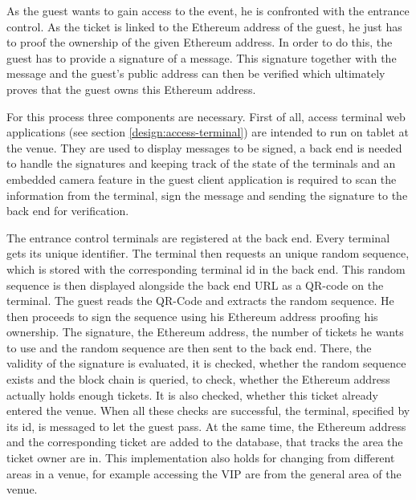 As the guest wants to gain access to the event, he is confronted with the entrance control. As the ticket is linked to the Ethereum address of the guest, he just has to proof the ownership of the given Ethereum address. In order to do this, the guest has to provide a signature of a message. This signature together with the message and the guest's public address can then be verified which ultimately proves that the guest owns this Ethereum address.

For this process three components are necessary. First of all, access terminal web applications (see section \ref{design:access-terminal}) are intended to run on tablet at the venue. They are used to display messages to be signed, a back end is needed to handle the signatures and keeping track of the state of the terminals and an embedded camera feature in the guest client application is required to scan the information from the terminal, sign the message and sending the signature to the back end for verification.



The entrance control terminals are registered at the back end. Every terminal gets its unique identifier. The terminal then requests an unique random sequence, which is stored with the corresponding terminal id in the back end. This random sequence is then displayed alongside the back end URL as a QR-code on the terminal. The guest reads the QR-Code and extracts the random sequence. He then proceeds to sign the sequence using his Ethereum address proofing his ownership. The signature, the Ethereum address, the number of tickets he wants to use and the random sequence are then sent to the back end. There, the validity of the signature is evaluated, it is checked, whether the random sequence exists and the block chain is queried, to check, whether the Ethereum address actually holds enough tickets. It is also checked, whether this ticket already entered the venue. When all these checks are successful, the terminal, specified by its id, is messaged to let the guest pass. At the same time, the Ethereum address and the corresponding ticket are added to the database, that tracks the area the ticket owner are in. This implementation also holds for changing from different areas in a venue, for example accessing the VIP are from the general area of the venue.


